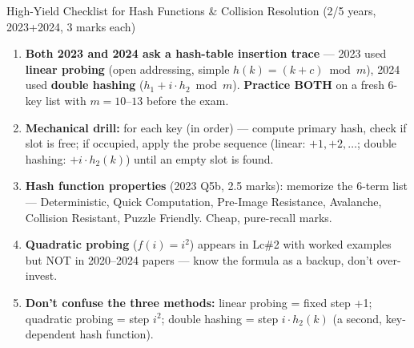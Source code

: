 \documentclass[12pt,a4paper]{article}
\begin{document}
\begin{keybox}{High-Yield Checklist for Hash Functions \& Collision Resolution (2/5 years, 2023+2024, 3 marks each)}
\begin{enumerate}[noitemsep]
  \item \textbf{Both 2023 and 2024 ask a hash-table insertion trace} --- 2023 used \textbf{linear probing} (open addressing, simple $h(k)=(k+c)\bmod m$), 2024 used \textbf{double hashing} ($h_1+i\cdot h_2 \bmod m$). \textbf{Practice BOTH} on a fresh 6-key list with $m=10$--$13$ before the exam.
  \item \textbf{Mechanical drill:} for each key (in order) --- compute primary hash, check if slot is free; if occupied, apply the probe sequence (linear: $+1,+2,\dots$; double hashing: $+i\cdot h_2(k)$) until an empty slot is found.
  \item \textbf{Hash function properties} (2023 Q5b, 2.5 marks): memorize the 6-term list --- Deterministic, Quick Computation, Pre-Image Resistance, Avalanche, Collision Resistant, Puzzle Friendly. Cheap, pure-recall marks.
  \item \textbf{Quadratic probing} ($f(i)=i^2$) appears in Lc\#2 with worked examples but NOT in 2020--2024 papers --- know the formula as a backup, don't over-invest.
  \item \textbf{Don't confuse the three methods:} linear probing = fixed step +1; quadratic probing = step $i^2$; double hashing = step $i\cdot h_2(k)$ (a second, key-dependent hash function).
\end{enumerate}
\end{keybox}
\end{document}

